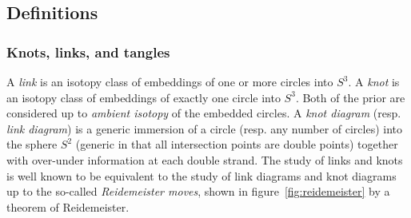\documentclass[amsmath,longbibliography,secnumarabic,floatfix,amssymb,nofootinbib,nobibnotes,letterpaper,11pt,tightenlines,notitlepage,showkeys,showlabels]{amsart}%
\theoremstyle{definition}
\begin{document}
\subsection{Definitions}
\label{sec:prelimdefs}

\subsubsection{Knots, links, and tangles}
\label{sec:knotlinktangledef}

A \emph{link} is an isotopy class of embeddings of one or more circles
into $S^3$. A \emph{knot} is an isotopy class of embeddings of exactly
one circle into $S^3$. Both of the prior are considered up to
\emph{ambient isotopy} of the embedded circles. A \emph{knot diagram}
(resp. \emph{link diagram}) is a generic immersion of a
circle (resp. any number of circles) into the sphere $S^2$ (generic in
that all intersection points are double points) together with
over-under information at each double strand. The study of links and
knots is well known to be equivalent to the study of link diagrams and
knot diagrams up to the so-called
\emph{Reidemeister moves}, shown in figure~\ref{fig:reidemeister} by a
theorem of Reidemeister.
\end{document}
